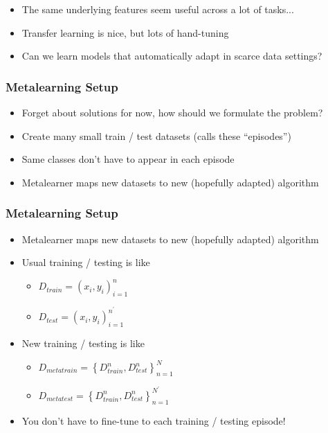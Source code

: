 \documentclass[10pt,mathserif]{beamer}
\begin{document}
\begin{frame}
  \begin{itemize}\itemsep=12pt
  \item The same underlying features seem useful across a lot of tasks...
  \item Transfer learning is nice, but lots of hand-tuning
  \item Can we learn models that automatically adapt in scarce data settings?
  \end{itemize}
\end{frame}

\begin{frame}
  \frametitle{Metalearning Setup}
  \begin{itemize}\itemsep=12pt
    \item Forget about solutions for now, how should we formulate the problem?
    \item Create many small train / test datasets (calls these ``episodes'')
    \item Same classes don't have to appear in each episode
    \item Metalearner maps new datasets to new (hopefully adapted) algorithm
  \end{itemize}
\end{frame}

\begin{frame}
  \frametitle{Metalearning Setup}
  \begin{itemize}\itemsep=12pt
    \item Metalearner maps new datasets to new (hopefully adapted) algorithm
    \item Usual training / testing is like
      \begin{itemize}
        \item $D_{train} = \left(x_i, y_i\right)_{i = 1}^{n}$
        \item $D_{test} = \left(x_i, y_i\right)_{i = 1}^{n^\prime}$
      \end{itemize}
    \item New training / testing is like
      \begin{itemize}
      \item $D_{metatrain} = \left\{D_{train}^{n}, D_{test}^{n}\right\}_{n = 1}^{N}$
      \item $D_{metatest} = \left\{D_{train}^{n}, D_{test}^{n}\right\}_{n = 1}^{N^\prime}$
      \end{itemize}
    \item You don't have to fine-tune to each training / testing episode!
  \end{itemize}
\end{frame}
\end{document}
